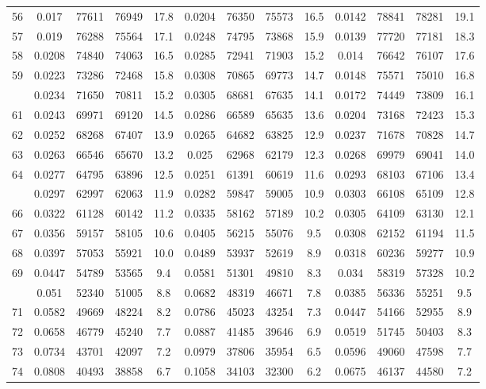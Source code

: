 \documentclass[
  14pt,
]{article}
\begin{document}
\begin{longtable}[t]{lcccccccccccc}
56 & 0.017 & 77611 & 76949 & 17.8 & 0.0204 & 76350 & 75573 & 16.5 & 0.0142 & 78841 & 78281 & 19.1\\
57 & 0.019 & 76288 & 75564 & 17.1 & 0.0248 & 74795 & 73868 & 15.9 & 0.0139 & 77720 & 77181 & 18.3\\
58 & 0.0208 & 74840 & 74063 & 16.5 & 0.0285 & 72941 & 71903 & 15.2 & 0.014 & 76642 & 76107 & 17.6\\
59 & 0.0223 & 73286 & 72468 & 15.8 & 0.0308 & 70865 & 69773 & 14.7 & 0.0148 & 75571 & 75010 & 16.8\\
\addlinespace
60 & 0.0234 & 71650 & 70811 & 15.2 & 0.0305 & 68681 & 67635 & 14.1 & 0.0172 & 74449 & 73809 & 16.1\\
61 & 0.0243 & 69971 & 69120 & 14.5 & 0.0286 & 66589 & 65635 & 13.6 & 0.0204 & 73168 & 72423 & 15.3\\
62 & 0.0252 & 68268 & 67407 & 13.9 & 0.0265 & 64682 & 63825 & 12.9 & 0.0237 & 71678 & 70828 & 14.7\\
63 & 0.0263 & 66546 & 65670 & 13.2 & 0.025 & 62968 & 62179 & 12.3 & 0.0268 & 69979 & 69041 & 14.0\\
64 & 0.0277 & 64795 & 63896 & 12.5 & 0.0251 & 61391 & 60619 & 11.6 & 0.0293 & 68103 & 67106 & 13.4\\
\addlinespace
65 & 0.0297 & 62997 & 62063 & 11.9 & 0.0282 & 59847 & 59005 & 10.9 & 0.0303 & 66108 & 65109 & 12.8\\
66 & 0.0322 & 61128 & 60142 & 11.2 & 0.0335 & 58162 & 57189 & 10.2 & 0.0305 & 64109 & 63130 & 12.1\\
67 & 0.0356 & 59157 & 58105 & 10.6 & 0.0405 & 56215 & 55076 & 9.5 & 0.0308 & 62152 & 61194 & 11.5\\
68 & 0.0397 & 57053 & 55921 & 10.0 & 0.0489 & 53937 & 52619 & 8.9 & 0.0318 & 60236 & 59277 & 10.9\\
69 & 0.0447 & 54789 & 53565 & 9.4 & 0.0581 & 51301 & 49810 & 8.3 & 0.034 & 58319 & 57328 & 10.2\\
\addlinespace
70 & 0.051 & 52340 & 51005 & 8.8 & 0.0682 & 48319 & 46671 & 7.8 & 0.0385 & 56336 & 55251 & 9.5\\
71 & 0.0582 & 49669 & 48224 & 8.2 & 0.0786 & 45023 & 43254 & 7.3 & 0.0447 & 54166 & 52955 & 8.9\\
72 & 0.0658 & 46779 & 45240 & 7.7 & 0.0887 & 41485 & 39646 & 6.9 & 0.0519 & 51745 & 50403 & 8.3\\
73 & 0.0734 & 43701 & 42097 & 7.2 & 0.0979 & 37806 & 35954 & 6.5 & 0.0596 & 49060 & 47598 & 7.7\\
74 & 0.0808 & 40493 & 38858 & 6.7 & 0.1058 & 34103 & 32300 & 6.2 & 0.0675 & 46137 & 44580 & 7.2\\

\end{longtable}
\end{document}
